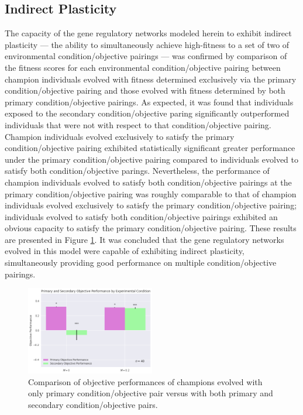 \subsection{Indirect Plasticity} \label{sec:indirect_result}
The capacity of the gene regulatory networks modeled herein to exhibit indirect plasticity --- the ability to simultaneously achieve high-fitness to a set of two of environmental condition/objective pairings --- was confirmed by comparison of the fitness scores for each environmental condition/objective pairing between champion individuals evolved with fitness determined exclusively via the primary condition/objective pairing and those evolved with fitness determined by both primary condition/objective pairings.
As expected, it was found that individuals exposed to the secondary condition/objective paring significantly outperformed individuals that were not with respect to that condition/objective pairing.
Champion individuals evolved exclusively to satisfy the primary condition/objective pairing exhibited statistically significant greater performance under the primary condition/objective pairing compared to individuals evolved to satisfy both condition/objective parings.
Nevertheless, the performance of champion individuals evolved to satisfy both condition/objective pairings at the primary condition/objective pairing was roughly comparable to that of champion individuals evolved exclusively to satisfy the primary condition/objective pairing; individuals evolved to satisfy both condition/objective pairings exhibited an obvious capacity to satisfy the primary condition/objective pairing.
These results are presented in Figure \ref{fig:primary_secondary_performance}.
It was concluded that the gene regulatory networks evolved in this model were capable of exhibiting indirect plasticity, simultaneously providing good performance on multiple condition/objective pairings.

\begin{figure}
    \centering
    \includegraphics[width=0.5\textwidth]{img/primary_secondary_performance}
  	\caption{Comparison of objective performances of champions evolved with only primary condition/objective pair versus with both primary and secondary condition/objective pairs.}
    \label{fig:primary_secondary_performance}
\end{figure}


